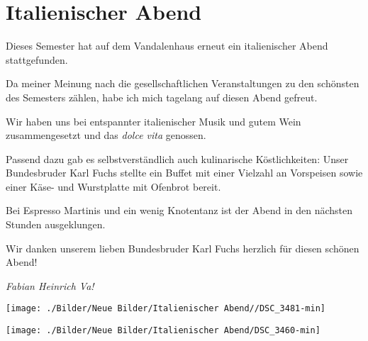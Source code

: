 \section{Italienischer Abend}

\begin{multicols}{2}

Dieses Semester hat auf dem Vandalenhaus erneut ein italienischer Abend
stattgefunden.

Da meiner Meinung nach
die gesellschaftlichen Veranstaltungen zu den schönsten des Semesters zählen,
habe ich mich tagelang auf diesen Abend gefreut.

Wir haben uns bei entspannter italienischer Musik und gutem Wein
zusammengesetzt und das \textit{dolce vita} genossen.

Passend dazu gab es
selbstverständlich auch kulinarische Köstlichkeiten: Unser Bundesbruder Karl
Fuchs stellte ein Buffet mit einer Vielzahl an Vorspeisen sowie einer Käse- und
Wurstplatte mit Ofenbrot bereit.

Bei Espresso Martinis und ein wenig Knotentanz ist der Abend in den
nächsten Stunden ausgeklungen.

Wir danken unserem lieben Bundesbruder Karl Fuchs herzlich für diesen
schönen Abend!


	\begin{flushright}
		\hfill\emph{Fabian Heinrich Va!}
	\end{flushright}
\end{multicols}


\begin{figurehere}
		\begin{center}
			\texttt{[image: ./Bilder/Neue Bilder/Italienischer Abend//DSC\_3481-min]}
		\end{center}
	\end{figurehere}

\begin{center}
	\begin{figurehere}\texttt{[image: ./Bilder/Neue Bilder/Italienischer Abend/DSC\_3460-min]}
	\end{figurehere}
\end{center}
	
